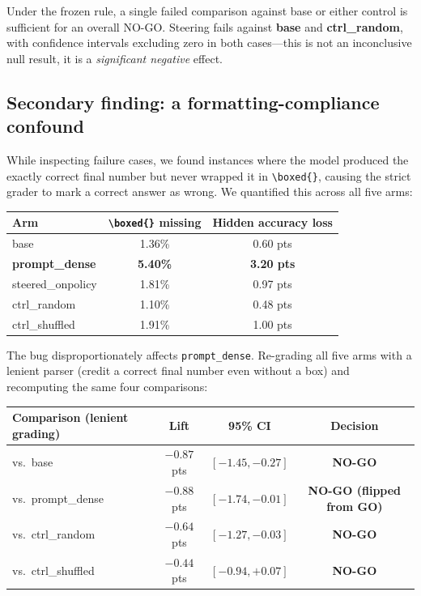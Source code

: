 \documentclass[11pt]{article}
\begin{document}
Under the frozen rule, a single failed comparison against base or either control is sufficient
for an overall NO-GO. Steering fails against \textbf{base} and \textbf{ctrl\_random}, with
confidence intervals excluding zero in both cases---this is not an inconclusive null result, it
is a \emph{significant negative} effect.

\subsection{Secondary finding: a formatting-compliance confound}

While inspecting failure cases, we found instances where the model produced the exactly correct
final number but never wrapped it in \texttt{\textbackslash boxed\{\}}, causing the strict grader
to mark a correct answer as wrong. We quantified this across all five arms:

\begin{table}[H]
\centering
\begin{tabular}{lcc}
\toprule
Arm & \texttt{\textbackslash boxed\{\}} missing & Hidden accuracy loss \\
\midrule
base & 1.36\% & 0.60 pts \\
\textbf{prompt\_dense} & \textbf{5.40\%} & \textbf{3.20 pts} \\
steered\_onpolicy & 1.81\% & 0.97 pts \\
ctrl\_random & 1.10\% & 0.48 pts \\
ctrl\_shuffled & 1.91\% & 1.00 pts \\
\bottomrule
\end{tabular}
\end{table}

The bug disproportionately affects \texttt{prompt\_dense}. Re-grading all five arms with a
lenient parser (credit a correct final number even without a box) and recomputing the same four
comparisons:

\begin{table}[H]
\centering
\begin{tabular}{lccc}
\toprule
Comparison (lenient grading) & Lift & 95\% CI & Decision \\
\midrule
vs.\ base & $-0.87$ pts & $[-1.45, -0.27]$ & \textbf{NO-GO} \\
vs.\ prompt\_dense & $-0.88$ pts & $[-1.74, -0.01]$ & \textbf{NO-GO (flipped from GO)} \\
vs.\ ctrl\_random & $-0.64$ pts & $[-1.27, -0.03]$ & \textbf{NO-GO} \\
vs.\ ctrl\_shuffled & $-0.44$ pts & $[-0.94, +0.07]$ & \textbf{NO-GO} \\
\bottomrule
\end{tabular}
\end{table}
\end{document}
